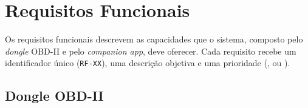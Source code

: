 \section{Requisitos Funcionais}
 
Os requisitos funcionais descrevem as capacidades que o sistema, composto pelo
\textit{dongle} OBD-II e pelo \textit{companion app}, deve oferecer. Cada requisito recebe um identificador único (\texttt{RF-XX}), uma descrição objetiva e uma
prioridade (\palta, \pmedia{} ou \pbaixa).
 
\subsection{Dongle OBD-II}
 
